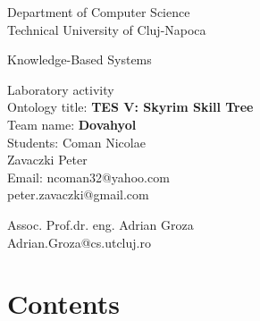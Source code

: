 \documentclass[a4paper,12pt]{report}
\begin{document}
\newcommand{\h}{\texttt}

\vspace{-5cm}
\begin{center}
Department of Computer Science\\
Technical University of Cluj-Napoca\\%
\end{center}
\vspace{1cm}
\begin{center}
\begin{Large}
Knowledge-Based Systems\\
\end{Large}
Laboratory activity\\


Ontology title: \textbf{TES V: Skyrim Skill Tree}\\
Team name: \textbf{Dovahyol}\\
Students: Coman Nicolae\\ 
          Zavaczki Peter\\
Email: ncoman32@yahoo.com\\
      peter.zavaczki@gmail.com\\

\vspace*{14cm}

Assoc. Prof.dr. eng. Adrian Groza\\
Adrian.Groza@cs.utcluj.ro
\end{center}

\newpage 

\tableofcontents
\clearpage
\chapter{Contents}
\end{document}
